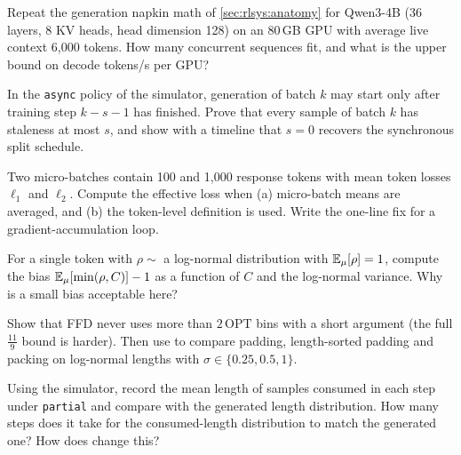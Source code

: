 \begin{exercise}[KV budget]
Repeat the generation napkin math of \cref{sec:rlsys:anatomy} for Qwen3-4B (36 layers, 8 KV
heads, head dimension 128) on an 80\,GB GPU with average live context 6{,}000 tokens. How many
concurrent sequences fit, and what is the upper bound on decode tokens/s per GPU?
\end{exercise}

\begin{exercise}
In the \texttt{async} policy of the simulator, generation of batch $k$ may start only after
training step $k-s-1$ has finished. Prove that every sample of batch $k$ has staleness at most
$s$, and show with a timeline that $s=0$ recovers the synchronous split schedule.
\end{exercise}

\begin{exercise}
Two micro-batches contain 100 and 1{,}000 response tokens with mean token losses $\ell_1$ and
$\ell_2$. Compute the effective loss when (a) micro-batch means are averaged, and (b) the
token-level definition is used. Write the one-line fix for a gradient-accumulation loop.
\end{exercise}

\begin{exercise}
For a single token with $\rho\sim$ a log-normal distribution with $\mathbb{E}_\mu[\rho]=1$, compute the
bias $\mathbb{E}_\mu[\min(\rho,C)]-1$ as a function of $C$ and the log-normal variance. Why is a
small bias acceptable here?
\end{exercise}

\begin{exercise}
Show that FFD never uses more than $2\,\mathrm{OPT}$ bins with a short argument (the full
$\tfrac{11}{9}$ bound is harder). Then use  to compare padding,
length-sorted padding and packing on log-normal lengths with $\sigma\in\{0.25,0.5,1\}$.
\end{exercise}

\begin{exercise}
Using the simulator, record the mean length of samples consumed in each step under
\texttt{partial} and compare with the generated length distribution. How many steps does it
take for the consumed-length distribution to match the generated one? How does
 change this?
\end{exercise}

